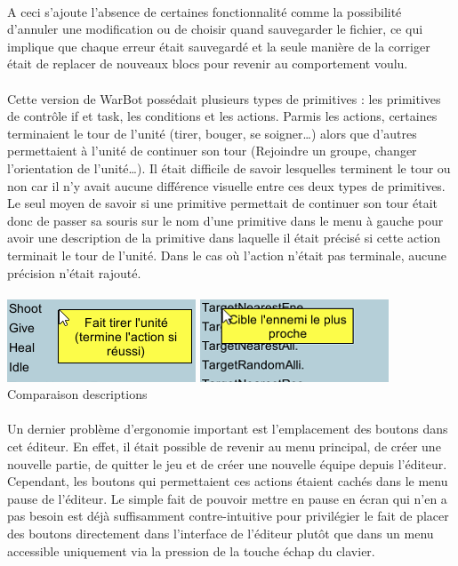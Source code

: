 \documentclass{report}
\begin{document}
\paragraph{}
    A ceci s’ajoute l’absence de certaines fonctionnalité comme la possibilité d’annuler une modification ou de choisir quand sauvegarder le fichier, ce qui implique que chaque erreur était sauvegardé et la seule manière de la corriger était de replacer de nouveaux blocs pour revenir au comportement voulu.
\paragraph{}
    Cette version de WarBot possédait plusieurs types de primitives : les primitives de contrôle if et task, les conditions et les actions. Parmis les actions, certaines terminaient le tour de l’unité (tirer, bouger, se soigner…) alors que d’autres permettaient à l’unité de continuer son tour (Rejoindre un groupe, changer l’orientation de l’unité…). Il était difficile de savoir lesquelles terminent le tour ou non car il n’y avait aucune différence visuelle entre ces deux types de primitives. Le seul moyen de savoir si une primitive permettait de continuer son tour était donc de passer sa souris sur le nom d’une primitive dans le menu à gauche pour avoir une description de la primitive dans laquelle il était précisé si cette action terminait le tour de l’unité. Dans le cas où l’action n’était pas terminale, aucune précision n’était rajouté.
\paragraph{}
\begin{center}
\includegraphics[scale=1]{DATA/terminale1.png}
\includegraphics[scale=1]{DATA/terminale2.png}
 {Comparaison descriptions}
\end{center}
\paragraph{}
    Un dernier problème d’ergonomie important est l’emplacement des boutons dans cet éditeur. En effet, il était possible de revenir au menu principal, de créer une nouvelle partie, de quitter le jeu et de créer une nouvelle équipe depuis l’éditeur. Cependant, les boutons qui permettaient ces actions étaient cachés dans le menu pause de l’éditeur. Le simple fait de pouvoir mettre en pause en écran qui n’en a pas besoin est déjà suffisamment contre-intuitive pour privilégier le fait de placer des boutons directement dans l’interface de l’éditeur plutôt que dans un menu accessible uniquement via la pression de la touche échap du clavier.
\end{document}
